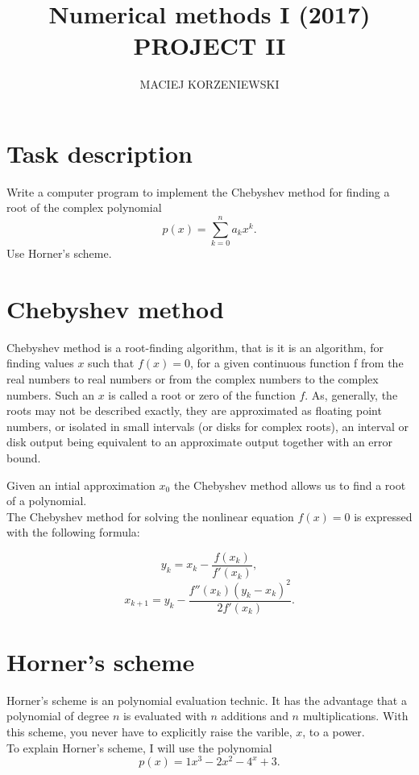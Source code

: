 \documentclass[a4paper,12pt]{article}
\title{\Large\bf Numerical methods  I (2017) \protect\\ PROJECT II}
\author{\Large\sf  MACIEJ KORZENIEWSKI}
\date{    }
\begin{document}
\maketitle

\bigskip

\section{Task description}

Write a computer program to implement the Chebyshev method for finding a root of the complex polynomial
\[
p(x) = \sum_{k = 0}^{n}a_{k}x^{k}.
\]
Use Horner's scheme.
\medskip

\section{Chebyshev method}

Chebyshev method is a root-finding algorithm, that is it is an algorithm, for finding values $x$ such that $f(x) = 0$, for a given continuous function f from the real numbers to real numbers or from the complex numbers to the complex numbers. Such an $x$ is called a root or zero of the function $f$. As, generally, the roots may not be described exactly, they are approximated as floating point numbers, or isolated in small intervals (or disks for complex roots), an interval or disk output being equivalent to an approximate output together with an error bound.


Given an intial approximation $x_{0}$ the Chebyshev method allows us to find a root of a polynomial.\\


The Chebyshev method  for solving the nonlinear equation $f(x) = 0$ is expressed with the following formula:

\[
y_{k}=x_{k}-\frac{f(x_{k})}{f'(x_{k})},
\]
\[
x_{k+1}=y_{k}-\frac{f''(x_{k}) (y_k-x_k)^2}{2 f'(x_{k})}.
\]

\section{Horner's scheme}

Horner's scheme is an polynomial evaluation technic. It has the advantage that a polynomial of degree $n$ is evaluated with $n$ additions and $n$ multiplications. With this scheme, you never have to explicitly raise the varible, $x$, to a power.\\

To explain Horner's scheme, I will use the polynomial
\[p(x) = 1x^3 - 2x^2 - 4^x + 3.
\]
\end{document}
